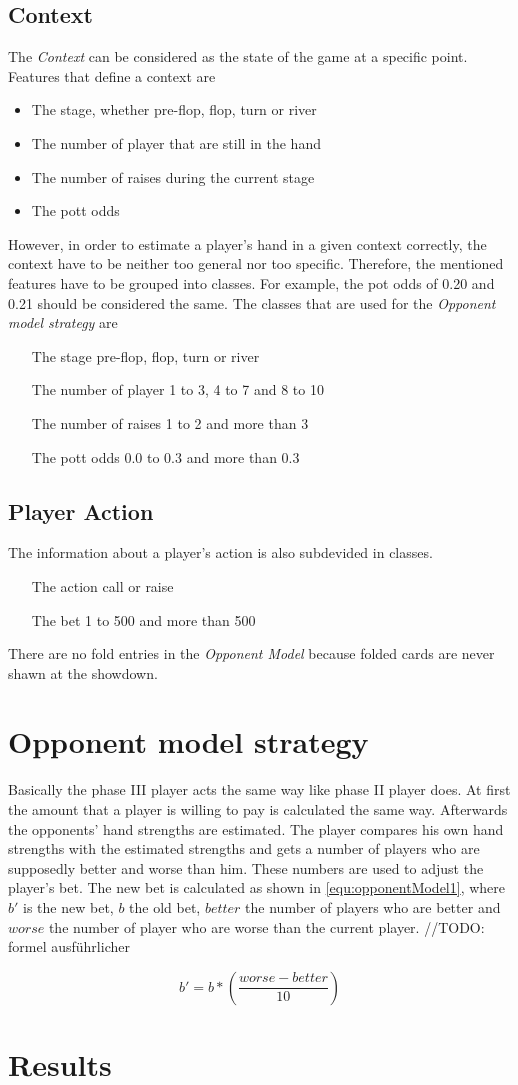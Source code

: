 \subsection{Context}
The \emph{Context} can be considered as the state of the game at a specific point. Features that define a context are 
\begin{itemize}
	\item The stage, whether pre-flop, flop, turn or river
	\item The number of player that are still in the hand
	\item The number of raises during the current stage
	\item The pott odds
\end{itemize}

However, in order to estimate a player's hand in a given context correctly, the context have to be neither too general nor too specific. Therefore, the mentioned features have to be grouped into classes. For example, the pot odds of 0.20 and 0.21 should be considered the same. The classes that are used for the \emph{Opponent model strategy} are 
\begin{itemize}
	\item [The stage]  pre-flop, flop, turn or river
	\item [The number of player] 1 to 3, 4 to 7 and 8 to 10
	\item [The number of raises] 1 to 2 and more than 3
	\item [The pott odds] 0.0 to 0.3 and more than 0.3
\end{itemize}

\subsection{Player Action}
The information about a player's action is also subdevided in classes.
\begin{itemize}
	\item [The action]  call or raise
	\item [The bet] 1 to 500 and more than 500
\end{itemize}
There are no fold entries in the \emph{Opponent Model} because folded cards are never shawn at the showdown. 

\section{Opponent model strategy}
Basically the phase III player acts the same way like phase II player does. At first the amount that a player is willing to pay is calculated the same way. Afterwards the opponents' hand strengths are estimated. The player compares his own hand strengths with the estimated strengths and gets a number of players who are supposedly better and worse than him. These numbers are used to adjust the player's bet. The new bet is calculated as shown in \ref{equ:opponentModel1}, where $b'$ is the new bet, $b$ the old bet, $better$ the number of players who are better and $worse$ the number of player who are worse than the current player.
//TODO: formel ausführlicher

\begin{equation}
	\label{equ:opponentModel1}
	b' = b * (\frac{worse - better}{10})
\end{equation}

\section{Results}

